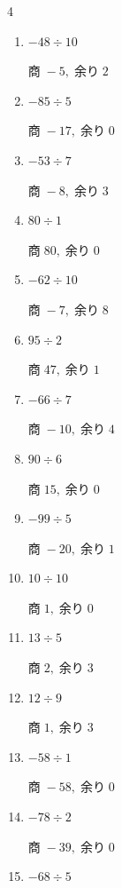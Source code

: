 \begin{multicols}{4}
\begin{enumerate}
        $商\; 3,\; 余り\; 1$

  \item $-48 \div 10$

        $商\; -5,\; 余り\; 2$

  \item $-85 \div 5$

        $商\; -17,\; 余り\; 0$

  \item $-53 \div 7$

        $商\; -8,\; 余り\; 3$

  \item $80 \div 1$

        $商\; 80,\; 余り\; 0$

  \item $-62 \div 10$

        $商\; -7,\; 余り\; 8$

  \item $95 \div 2$

        $商\; 47,\; 余り\; 1$

  \item $-66 \div 7$

        $商\; -10,\; 余り\; 4$

\columnbreak %

  \item $90 \div 6$

        $商\; 15,\; 余り\; 0$

  \item $-99 \div 5$

        $商\; -20,\; 余り\; 1$

  \item $10 \div 10$

        $商\; 1,\; 余り\; 0$

  \item $13 \div 5$

        $商\; 2,\; 余り\; 3$

  \item $12 \div 9$

        $商\; 1,\; 余り\; 3$

  \item $-58 \div 1$

        $商\; -58,\; 余り\; 0$

  \item $-78 \div 2$

        $商\; -39,\; 余り\; 0$

  \item $-68 \div 5$


\end{enumerate}
\end{multicols}
